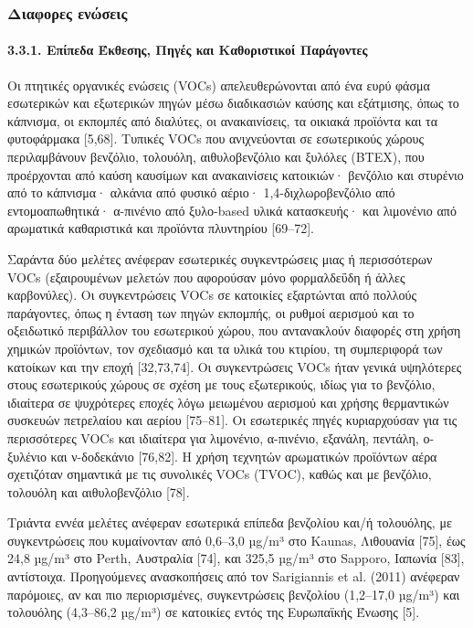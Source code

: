 \cite{su12219045}

\subsubsection{Διαφορες ενώσεις}

\paragraph{3.3.1. Επίπεδα Έκθεσης, Πηγές και Καθοριστικοί Παράγοντες}
Οι πτητικές οργανικές ενώσεις (VOCs) απελευθερώνονται από ένα ευρύ φάσμα εσωτερικών και εξωτερικών πηγών μέσω διαδικασιών καύσης και εξάτμισης, όπως το κάπνισμα, οι εκπομπές από διαλύτες, οι ανακαινίσεις, τα οικιακά προϊόντα και τα φυτοφάρμακα [5,68]. Τυπικές VOCs που ανιχνεύονται σε εσωτερικούς χώρους περιλαμβάνουν βενζόλιο, τολουόλη, αιθυλοβενζόλιο και ξυλόλες (BTEX), που προέρχονται από καύση καυσίμων και ανακαινίσεις κατοικιών· βενζόλιο και στυρένιο από το κάπνισμα· αλκάνια από φυσικό αέριο· 1,4-διχλωροβενζόλιο από εντομοαπωθητικά· α-πινένιο από ξυλο-based υλικά κατασκευής· και λιμονένιο από αρωματικά καθαριστικά και προϊόντα πλυντηρίου [69–72].

Σαράντα δύο μελέτες ανέφεραν εσωτερικές συγκεντρώσεις μιας ή περισσότερων VOCs (εξαιρουμένων μελετών που αφορούσαν μόνο φορμαλδεΰδη ή άλλες καρβονύλες). Οι συγκεντρώσεις VOCs σε κατοικίες εξαρτώνται από πολλούς παράγοντες, όπως η ένταση των πηγών εκπομπής, οι ρυθμοί αερισμού και το οξειδωτικό περιβάλλον του εσωτερικού χώρου, που αντανακλούν διαφορές στη χρήση χημικών προϊόντων, τον σχεδιασμό και τα υλικά του κτιρίου, τη συμπεριφορά των κατοίκων και την εποχή [32,73,74]. Οι συγκεντρώσεις VOCs ήταν γενικά υψηλότερες στους εσωτερικούς χώρους σε σχέση με τους εξωτερικούς, ιδίως για το βενζόλιο, ιδιαίτερα σε ψυχρότερες εποχές λόγω μειωμένου αερισμού και χρήσης θερμαντικών συσκευών πετρελαίου και αερίου [75–81]. Οι εσωτερικές πηγές κυριαρχούσαν για τις περισσότερες VOCs και ιδιαίτερα για λιμονένιο, α-πινένιο, εξανάλη, πεντάλη, ο-ξυλένιο και ν-δοδεκάνιο [76,82]. Η χρήση τεχνητών αρωματικών προϊόντων αέρα σχετιζόταν σημαντικά με τις συνολικές VOCs (TVOC), καθώς και με βενζόλιο, τολουόλη και αιθυλοβενζόλιο [78].

Τριάντα εννέα μελέτες ανέφεραν εσωτερικά επίπεδα βενζολίου και/ή τολουόλης, με συγκεντρώσεις που κυμαίνονταν από 0,6–3,0 µg/m³ στο Kaunas, Λιθουανία [75], έως 24,8 µg/m³ στο Perth, Αυστραλία [74], και 325,5 µg/m³ στο Sapporo, Ιαπωνία [83], αντίστοιχα. Προηγούμενες ανασκοπήσεις από τον Sarigiannis et al. (2011) ανέφεραν παρόμοιες, αν και πιο περιορισμένες, συγκεντρώσεις βενζολίου (1,2–17,0 µg/m³) και τολουόλης (4,3–86,2 µg/m³) σε κατοικίες εντός της Ευρωπαϊκής Ένωσης [5].

